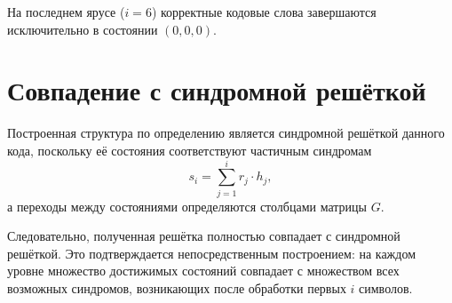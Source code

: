 \documentclass[a4paper,12pt]{article}
\begin{document}
На последнем ярусе ($i = 6$) корректные кодовые слова завершаются исключительно в состоянии $(0,0,0)$.

\section{Совпадение с синдромной решёткой}

Построенная структура по определению является синдромной решёткой данного кода, поскольку её состояния соответствуют частичным синдромам
\[
s_i = \sum_{j=1}^{i} r_j \cdot h_j,
\]
а переходы между состояниями определяются столбцами матрицы $G$.

Следовательно, полученная решётка полностью совпадает с синдромной решёткой. Это подтверждается непосредственным построением: на каждом уровне множество достижимых состояний совпадает с множеством всех возможных синдромов, возникающих после обработки первых $i$ символов.
\end{document}
